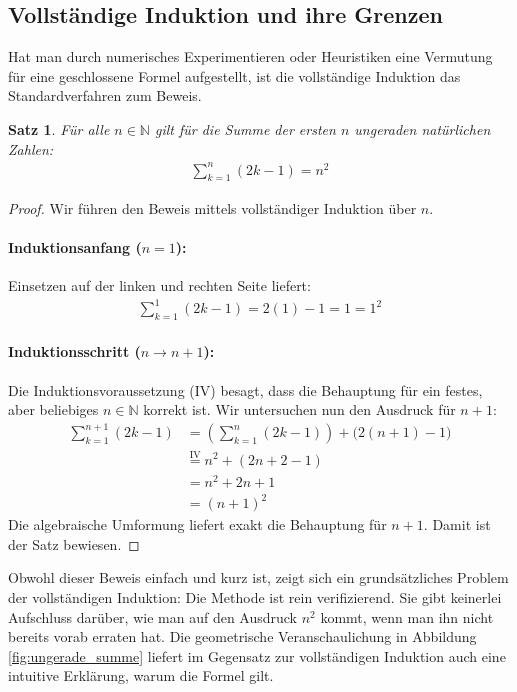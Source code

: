 \documentclass{article}
\newtheorem{thm}{Satz}
\theoremstyle{definition}
\begin{document}
\subsection{Vollständige Induktion und ihre Grenzen}
Hat man durch numerisches Experimentieren oder Heuristiken eine Vermutung für eine geschlossene Formel aufgestellt, ist die vollständige Induktion das Standardverfahren zum Beweis.

\begin{thm}
Für alle $n \in \mathbb{N}$ gilt für die Summe der ersten $n$ ungeraden natürlichen Zahlen:
\begin{align*}
    \sum_{k=1}^n (2k - 1) = n^2
\end{align*}
\end{thm}

\begin{proof}
Wir führen den Beweis mittels vollständiger Induktion über $n$.

\paragraph{Induktionsanfang ($n=1$):} Einsetzen auf der linken und rechten Seite liefert:
\begin{align*}
\sum_{k=1}^1 (2k-1) = 2(1)-1 = 1 = 1^2
\end{align*}

\paragraph{Induktionsschritt ($n \rightarrow n+1$):} Die Induktionsvoraussetzung (IV) besagt, dass die Behauptung für ein festes, aber beliebiges $n \in \mathbb{N}$ korrekt ist. Wir untersuchen nun den Ausdruck für $n+1$:
\begin{align*}
    \sum_{k=1}^{n+1} (2k - 1) &= \left( \sum_{k=1}^n (2k - 1) \right) + \Big(2(n+1) - 1\Big) \\
    &\stackrel{\text{IV}}{=} n^2 + (2n + 2 - 1) \\
    &= n^2 + 2n + 1 \\
    &= (n+1)^2
\end{align*}
Die algebraische Umformung liefert exakt die Behauptung für $n+1$. Damit ist der Satz bewiesen.
\end{proof}

Obwohl dieser Beweis einfach und kurz ist, zeigt sich ein grundsätzliches Problem der vollständigen Induktion: Die Methode ist rein verifizierend. Sie gibt keinerlei Aufschluss darüber, wie man auf den Ausdruck $n^2$ kommt, wenn man ihn nicht bereits vorab erraten hat. Die geometrische Veranschaulichung in Abbildung \ref{fig:ungerade_summe} liefert im Gegensatz zur vollständigen Induktion auch eine intuitive Erklärung, warum die Formel gilt.
\end{document}
